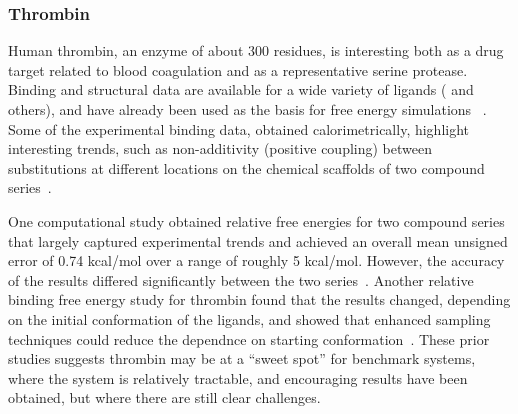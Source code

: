 \documentclass[aps,pre,twocolumn,nofootinbib,superscriptaddress,10pt, final,tightenlines]{revtex4-1}
\begin{document}
\subsubsection{Thrombin}
Human thrombin, an enzyme of about 300 residues, is interesting both as a drug target related to blood coagulation and as a representative serine protease. 
Binding and structural data are available for a wide variety of ligands (\cite{baum_non-additivity_2010, StefanicAnderluh:2005:J.Med.Chem., Ueno:2005:Bioorganic&MedicinalChemistryLetters, Putta:2005:J.Med.Chem., baum_non-additivity_2010} and others),
and have already been used as the basis for free energy simulations ~\cite{wang_achieving_2012, schrodinger_accurate_2015, calabro_elucidation_2016}.
Some of the experimental binding data, obtained calorimetrically, highlight interesting trends, such as non-additivity (positive coupling) between substitutions at different locations on the chemical scaffolds of two compound series~\cite{baum_non-additivity_2010}. 

One computational study obtained relative free energies for two compound series that largely captured experimental trends and achieved an overall mean unsigned error of 0.74 kcal/mol over a range of roughly 5 kcal/mol.
However, the accuracy of the results differed significantly between the two series~\cite{calabro_elucidation_2016}.
Another relative binding free energy study for thrombin found that the results changed, depending on the initial conformation of the ligands, and showed that enhanced sampling techniques could reduce the dependnce on starting conformation~\cite{wang_achieving_2012}.
These prior studies suggests thrombin may be at a ``sweet spot'' for benchmark systems, where the system is relatively tractable, and encouraging results have been obtained, but where there are still clear challenges. 
\end{document}
